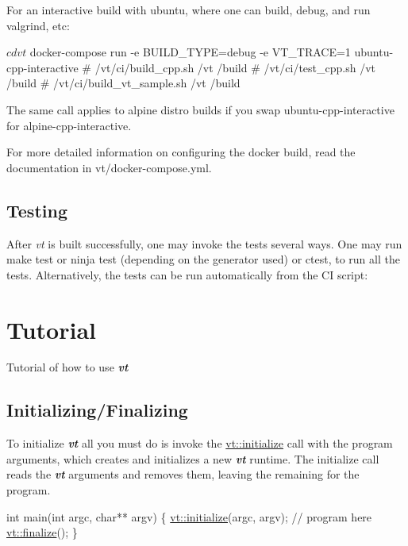 For an interactive build with ubuntu, where one can build, debug, and run {\ttfamily valgrind}, etc\+:


\begin{DoxyCode}
$ cd vt
$ docker-compose run -e BUILD\_TYPE=debug -e VT\_TRACE=1 ubuntu-cpp-interactive
# /vt/ci/build\_cpp.sh /vt /build
# /vt/ci/test\_cpp.sh /vt /build
# /vt/ci/build\_vt\_sample.sh /vt /build
\end{DoxyCode}


The same call applies to alpine distro builds if you swap {\ttfamily ubuntu-\/cpp-\/interactive} for {\ttfamily alpine-\/cpp-\/interactive}.

For more detailed information on configuring the docker build, read the documentation in {\ttfamily vt/docker-\/compose.\+yml}.\hypertarget{vt-build_test-vt}{}\subsection{Testing}\label{vt-build_test-vt}
After {\itshape vt} is built successfully, one may invoke the tests several ways. One may run {\ttfamily make test} or {\ttfamily ninja test} (depending on the generator used) or {\ttfamily ctest}, to run all the tests. Alternatively, the tests can be run automatically from the CI script\+:


 \hypertarget{tutorial}{}\section{Tutorial}\label{tutorial}
Tutorial of how to use {\bfseries {\itshape vt}}\hypertarget{tutorial_tutorial-init-finalize-vt}{}\subsection{Initializing/\+Finalizing}\label{tutorial_tutorial-init-finalize-vt}
To initialize {\bfseries {\itshape vt}} all you must do is invoke the {\ttfamily \hyperlink{namespacevt_aaa266774ea8339c58be0202b00fafa62}{vt\+::initialize}} call with the program arguments, which creates and initializes a new {\bfseries {\itshape vt}} runtime. The initialize call reads the {\bfseries {\itshape vt}} arguments and removes them, leaving the remaining for the program.


\begin{DoxyCode}
\textcolor{keywordtype}{int} main(\textcolor{keywordtype}{int} argc, \textcolor{keywordtype}{char}** argv) \{
  \hyperlink{namespacevt_aaa266774ea8339c58be0202b00fafa62}{vt::initialize}(argc, argv);
   \textcolor{comment}{// program here}
  \hyperlink{namespacevt_a540d90dbd6e97b69f1dcbc9ee9314cff}{vt::finalize}();
\}
\end{DoxyCode}


